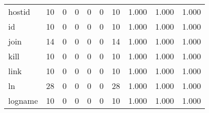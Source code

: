 \begin{longtable}{lp{2.0cm}p{2.0cm}p{2.0cm}p{2.0cm}p{2.0cm}p{2.0cm}p{2.0cm}p{2.0cm}p{2.0cm}}
hostid    &                     10 &                                             0 &                                            0 &                                           0 &                                            0 &                                         10 &                                1.000 &                                  1.000 &                                1.000 \\
id        &                     10 &                                             0 &                                            0 &                                           0 &                                            0 &                                         10 &                                1.000 &                                  1.000 &                                1.000 \\
join      &                     14 &                                             0 &                                            0 &                                           0 &                                            0 &                                         14 &                                1.000 &                                  1.000 &                                1.000 \\
kill      &                     10 &                                             0 &                                            0 &                                           0 &                                            0 &                                         10 &                                1.000 &                                  1.000 &                                1.000 \\
link      &                     10 &                                             0 &                                            0 &                                           0 &                                            0 &                                         10 &                                1.000 &                                  1.000 &                                1.000 \\
ln        &                     28 &                                             0 &                                            0 &                                           0 &                                            0 &                                         28 &                                1.000 &                                  1.000 &                                1.000 \\
logname   &                     10 &                                             0 &                                            0 &                                           0 &                                            0 &                                         10 &                                1.000 &                                  1.000 &                                1.000 \\

\end{longtable}
